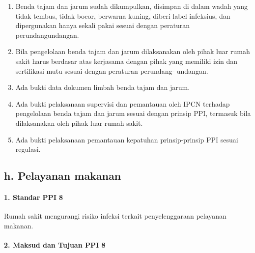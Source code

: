 \documentclass[
]{book}
\providecommand{\tightlist}{%
  \setlength{\itemsep}{0pt}\setlength{\parskip}{0pt}}
\begin{document}
\begin{enumerate}
\def\labelenumi{\alph{enumi}.}
\tightlist
\item
  Benda tajam dan jarum sudah dikumpulkan, disimpan di dalam wadah yang tidak tembus, tidak bocor, berwarna kuning, diberi label infeksius, dan dipergunakan hanya sekali pakai sesuai dengan peraturan perundangundangan.
\item
  Bila pengelolaan benda tajam dan jarum dilaksanakan oleh pihak luar rumah sakit harus berdasar atas kerjasama dengan pihak yang memiliki izin dan sertifikasi mutu sesuai dengan peraturan perundang- undangan.
\item
  Ada bukti data dokumen limbah benda tajam dan jarum.
\item
  Ada bukti pelaksanaan supervisi dan pemantauan oleh IPCN terhadap pengelolaan benda tajam dan jarum sesuai dengan prinsip PPI, termasuk bila dilaksanakan oleh pihak luar rumah sakit.
\item
  Ada bukti pelaksanaan pemantauan kepatuhan prinsip-prinsip PPI sesuai regulasi.
\end{enumerate}

\hypertarget{h.-pelayanan-makanan}{%
\subsection*{h. Pelayanan makanan}\label{h.-pelayanan-makanan}}

\hypertarget{standar-ppi-8}{%
\paragraph*{1. Standar PPI 8}\label{standar-ppi-8}}

Rumah sakit mengurangi risiko infeksi terkait penyelenggaraan pelayanan makanan.

\hypertarget{maksud-dan-tujuan-ppi-8}{%
\paragraph*{2. Maksud dan Tujuan PPI 8}\label{maksud-dan-tujuan-ppi-8}}
\end{document}
